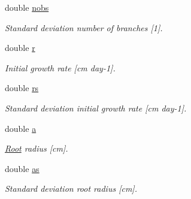 \begin{DoxyCompactItemize}
double \hyperlink{classCPlantBox_1_1StemRandomOrganParameter_a4e82a3f506878722f6fac8473bff8761}{nobs}
\begin{DoxyCompactList}\small\item\em Standard deviation number of branches \mbox{[}1\mbox{]}. \end{DoxyCompactList}\item 
\mbox{\label{classCPlantBox_1_1StemRandomOrganParameter_a4d02e1e41a92ecc94de02dda768450d7}} 
double \hyperlink{classCPlantBox_1_1StemRandomOrganParameter_a4d02e1e41a92ecc94de02dda768450d7}{r}
\begin{DoxyCompactList}\small\item\em Initial growth rate \mbox{[}cm day-\/1\mbox{]}. \end{DoxyCompactList}\item 
\mbox{\label{classCPlantBox_1_1StemRandomOrganParameter_a6eb14e07bcd3043fc6f224c01a7ee9b8}} 
double \hyperlink{classCPlantBox_1_1StemRandomOrganParameter_a6eb14e07bcd3043fc6f224c01a7ee9b8}{rs}
\begin{DoxyCompactList}\small\item\em Standard deviation initial growth rate \mbox{[}cm day-\/1\mbox{]}. \end{DoxyCompactList}\item 
\mbox{\label{classCPlantBox_1_1StemRandomOrganParameter_a20a2c0ce2abbfbc1483dbf15e242b256}} 
double \hyperlink{classCPlantBox_1_1StemRandomOrganParameter_a20a2c0ce2abbfbc1483dbf15e242b256}{a}
\begin{DoxyCompactList}\small\item\em \hyperlink{classCPlantBox_1_1Root}{Root} radius \mbox{[}cm\mbox{]}. \end{DoxyCompactList}\item 
\mbox{\label{classCPlantBox_1_1StemRandomOrganParameter_acbe093491b3cd536887ddae6caf179b8}} 
double \hyperlink{classCPlantBox_1_1StemRandomOrganParameter_acbe093491b3cd536887ddae6caf179b8}{as}
\begin{DoxyCompactList}\small\item\em Standard deviation root radius \mbox{[}cm\mbox{]}. \end{DoxyCompactList}\item 

\end{DoxyCompactItemize}
